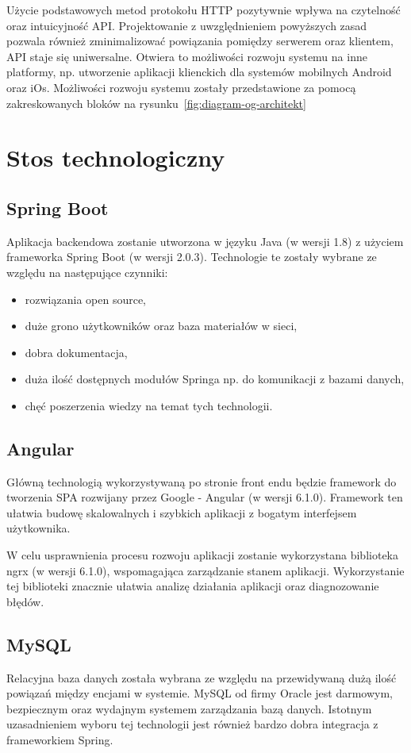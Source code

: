 Użycie podstawowych metod protokołu HTTP pozytywnie wpływa na czytelność oraz intuicyjność API. Projektowanie z uwzględnieniem powyższych zasad pozwala również zminimalizować powiązania pomiędzy serwerem oraz klientem, API staje się uniwersalne. Otwiera to możliwości rozwoju systemu na inne platformy, np. utworzenie aplikacji klienckich dla systemów mobilnych Android oraz iOs. Możliwości rozwoju systemu zostały przedstawione za pomocą zakreskowanych bloków na rysunku~\ref{fig:diagram-og-architekt}

\section{Stos technologiczny}

\subsection{Spring Boot}

Aplikacja backendowa zostanie utworzona w języku Java (w wersji 1.8) z użyciem frameworka Spring Boot (w wersji 2.0.3). Technologie te zostały wybrane ze względu na następujące czynniki:
 \begin{itemize}
\item rozwiązania open source,
\item duże grono użytkowników oraz baza materiałów w sieci,
\item dobra dokumentacja,
\item duża ilość dostępnych modułów Springa np. do komunikacji z bazami danych,
\item chęć poszerzenia wiedzy na temat tych technologii.
\end{itemize}

\subsection{Angular}

Główną technologią wykorzystywaną po stronie front endu będzie framework do tworzenia SPA rozwijany przez Google - Angular (w wersji 6.1.0). Framework ten ułatwia budowę skalowalnych i szybkich aplikacji z bogatym interfejsem użytkownika. 

W celu usprawnienia procesu rozwoju aplikacji zostanie wykorzystana biblioteka ngrx (w wersji 6.1.0), wspomagająca zarządzanie stanem aplikacji. Wykorzystanie tej biblioteki znacznie ułatwia analizę działania aplikacji oraz diagnozowanie błędów.

\subsection{MySQL} 

Relacyjna baza danych została wybrana ze względu na przewidywaną dużą ilość powiązań między encjami w systemie. MySQL od firmy Oracle jest darmowym, bezpiecznym oraz wydajnym systemem zarządzania bazą danych.  Istotnym uzasadnieniem wyboru tej technologii jest również bardzo dobra integracja z frameworkiem Spring.